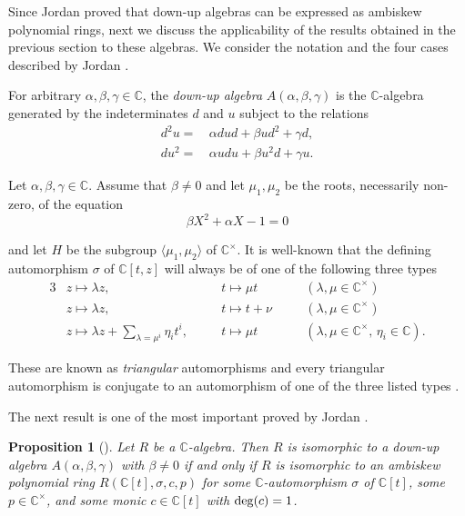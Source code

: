 \documentclass{amsart}
\newtheorem{proposition}[theorem]{Proposition}
\theoremstyle{definition}
\theoremstyle{remark}
\numberwithin{equation}{section}
\begin{document}
Since Jordan \cite[Theorem 3.1]{Jordan2000} proved that down-up algebras can be expressed as ambiskew polynomial rings, next we discuss the applicability of the results obtained in the previous section to these algebras. We consider the notation and the four cases described by Jordan \cite[Section 3]{Jordan2000}.

For arbitrary $\alpha, \beta, \gamma \in \mathbb{C}$, the {\em down-up algebra} $A(\alpha, \beta, \gamma)$ is the $\mathbb{C}$-algebra generated by the indeterminates $d$ and $u$ subject to the relations
\begin{align}
    d^2 u = &\, \alpha dud + \beta ud^2 + \gamma d, \label{Jordan2000(1a)}\\
    du^2 = &\, \alpha u du + \beta u^2 d + \gamma u. \label{Jordan2000(1b)}
\end{align}

Let $\alpha, \beta, \gamma \in \mathbb{C}$. Assume that $\beta \neq 0$ and let $\mu_1, \mu_2$ be the roots, necessarily non-zero, of the equation
\begin{equation}\label{Jordan2000(10)}
    \beta X^2 + \alpha X - 1 = 0
\end{equation}

and let $H$ be the subgroup $\langle \mu_1, \mu_2 \rangle$ of $\mathbb{C}^{\times}$. It is well-known that the defining automorphism $\sigma$ of $\mathbb{C}[t, z]$ will always be of one of the following three types
\begin{alignat*}{3}
  & z \mapsto \lambda z, \quad && t\mapsto \mu t \quad  && (\lambda, \mu \in \mathbb{C}^{\times})\\
  & z \mapsto \lambda z, && t \mapsto t + \nu \quad && (\lambda, \mu \in \mathbb{C}^{\times})\\
  & z \mapsto \lambda z + \sum_{\lambda = \mu^{i}} \eta_i t^{i}, \quad && t \mapsto \mu t \quad && (\lambda, \mu \in \mathbb{C}^{\times}, \, \eta_i \in \mathbb{C}).
\end{alignat*}

These are known as {\em triangular} automorphisms \cite{Lane1975} and every triangular automorphism is conjugate to an automorphism of one of the three listed types \cite[Proposition 1]{Smith1984}.

The next result is one of the most important proved by Jordan \cite{Jordan2000}.

\begin{proposition}[{\cite[Theorem 3.1]{Jordan2000}}]\label{Jordan2000Theorem3.1}
Let $R$ be a $\mathbb{C}$-algebra. Then $R$ is isomorphic to a down-up algebra $A(\alpha, \beta, \gamma)$ with $\beta \neq 0$ if and only if $R$ is isomorphic to an ambiskew polynomial ring $R(\mathbb{C}[t], \sigma, c, p)$ for some $\mathbb{C}$-automorphism $\sigma$ of $\mathbb{C}[t]$, some $p\in \mathbb{C}^{\times}$, and some monic $c\in \mathbb{C}[t]$ with ${\rm deg}(c) = 1$.
\end{proposition}
\end{document}
